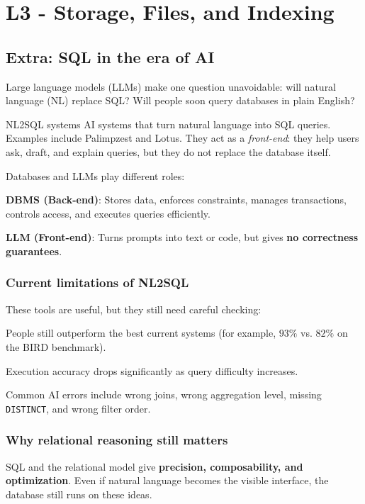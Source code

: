 \documentclass[../../dis.tex]{subfiles}
\begin{document}
\chapter{L3 - Storage, Files, and Indexing}\label{chap:l3}
\newpage
\section*{Extra: SQL in the era of AI}
Large language models (LLMs) make one question unavoidable: will natural language (NL) replace SQL? Will people soon query databases in plain English?

\begin{concept}{NL2SQL systems}
AI systems that turn natural language into SQL queries. Examples include Palimpzest and Lotus. They act as a \emph{front-end}: they help users ask, draft, and explain queries, but they do not replace the database itself.
\end{concept}

Databases and LLMs play different roles:
\begin{dashlist}
    \item \textbf{DBMS (Back-end)}: Stores data, enforces constraints, manages transactions, controls access, and executes queries efficiently.
    \item \textbf{LLM (Front-end)}: Turns prompts into text or code, but gives \textbf{no correctness guarantees}.
\end{dashlist}
\subsection*{Current limitations of NL2SQL}
These tools are useful, but they still need careful checking:
\begin{dashlist}
    \item People still outperform the best current systems (for example, $93\%$ vs. $82\%$ on the BIRD benchmark).
    \item Execution accuracy drops significantly as query difficulty increases.
    \item Common AI errors include wrong joins, wrong aggregation level, missing \texttt{DISTINCT}, and wrong filter order.
\end{dashlist}

\subsection*{Why relational reasoning still matters}
SQL and the relational model give \textbf{precision, composability, and optimization}. Even if natural language becomes the visible interface, the database still runs on these ideas.
\end{document}
